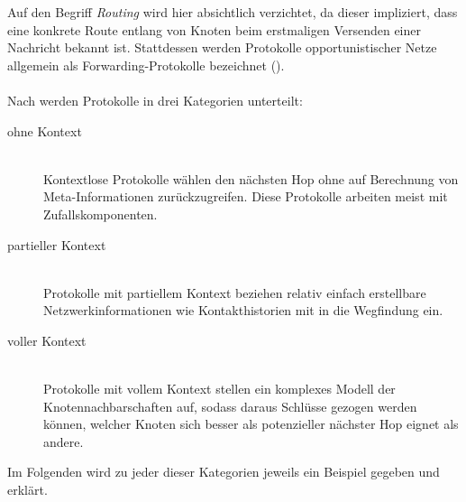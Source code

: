 \documentclass[a4paper, 12pt]{article}
\begin{document}
Auf den Begriff \emph{Routing} wird hier absichtlich verzichtet, da dieser impliziert, dass eine konkrete Route entlang von Knoten beim erstmaligen Versenden einer Nachricht bekannt ist. Stattdessen werden Protokolle opportunistischer Netze allgemein als Forwarding-Protokolle bezeichnet (\cite[p.10]{Mota20145}).
\\\\
Nach \cite{Mota20145} werden Protokolle in drei Kategorien unterteilt:
\begin{description}
	\item [ohne Kontext]\hfill \\
	Kontextlose Protokolle wählen den nächsten Hop ohne auf Berechnung von Meta-Informationen zurückzugreifen. Diese Protokolle arbeiten meist mit Zufallskomponenten.
	\item [partieller Kontext]\hfill \\
	Protokolle mit partiellem Kontext beziehen relativ einfach erstellbare Netzwerkinformationen wie Kontakthistorien mit in die Wegfindung ein.
	\item [voller Kontext]\hfill \\
	Protokolle mit vollem Kontext stellen ein komplexes Modell der Knotennachbarschaften auf, sodass daraus Schlüsse gezogen werden können, welcher Knoten sich besser als potenzieller nächster Hop eignet als andere.
\end{description}
Im Folgenden wird zu jeder dieser Kategorien jeweils ein Beispiel gegeben und erklärt.
\end{document}
